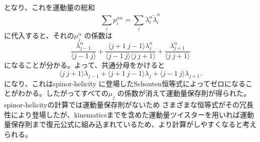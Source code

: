 \documentclass[uplatex,dvipdfmx,a4paper,11pt]{jsarticle}
\numberwithin{equation}{section}
\begin{document}
となり、これを運動量の総和
\[
\sum_i p_i^{\alpha\dot\alpha}
=
\sum _i\lambda_i^\alpha\tilde\lambda_i^{\dot\alpha}
\]
に代入すると、それの\(\mu_j^{\dot\alpha}\) の係数は
\[
\frac{\lambda_{j-1}^{\alpha}}
{\langle j-1\ j\rangle}
+
\frac{
\langle j+1\ j-1\rangle\lambda_j^{\alpha}
}{
\langle j-1\ j\rangle\langle j\ j+1\rangle
}
+
\frac{\lambda_{j+1}^{\alpha}}
{\langle j\ j+1\rangle}
\]
になることが分かる。よって、共通分母をかけると
\[
\langle j\ j+1\rangle\lambda_{j-1}
+
\langle j+1\ j-1\rangle\lambda_j
+
\langle j-1\ j\rangle\lambda_{j+1}.
\]
になり、これはspinor-helicity に登場したSchouten恒等式によってゼロになることがわかる。したがってすべての\(\mu_j\) の係数が消えて運動量保存則が得られた。spinor-helicityの計算では運動量保存則がないため
さまざまな恒等式がその冗長性により登場したが、kinematicsまでを含めた運動量ツイスターを用いれば運動量保存則まで復元公式に組み込まれているため、より計算がしやすくなると考えられる。
\end{document}

